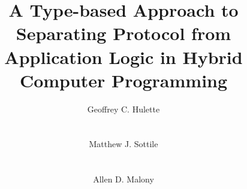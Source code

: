 \documentclass{acm_proc_article-sp}
\begin{document}
\title{A Type-based Approach to Separating Protocol from Application Logic in Hybrid Computer Programming}


\author{
\alignauthor
Geoffrey C. Hulette\\
\\
\\
\alignauthor
Matthew J. Sottile\\
\\
\\
\alignauthor
Allen D. Malony\\
\\
\\
}

\maketitle













\end{document}
